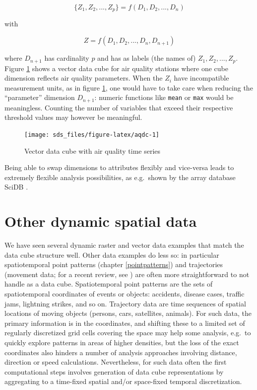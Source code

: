 \documentclass[]{book}
\begin{document}
\[\{Z_1,Z_2,...,Z_p\} = f(D_1,D_2,...,D_n)\]

with

\[Z = f(D_1,D_2,...,D_n, D_{n+1})\]

where \(D_{n+1}\) has cardinality \(p\) and has as labels (the names
of) \(Z_1,Z_2,...,Z_p\). Figure \ref{fig:aqdc} shows a vector data
cube for air quality stations where one cube dimension reflects
air quality parameters. When the \(Z_i\) have incompatible measurement
units, as in figure \ref{fig:aqdc}, one would have to take care
when reducing the ``parameter'' dimension \(D_{n+1}\): numeric functions
like \texttt{mean} or \texttt{max} would be meaningless. Counting the number of
variables that exceed their respective threshold values may however
be meaningful.

\begin{figure}

{\centering \texttt{[image: sds\_files/figure-latex/aqdc-1]} 

}

\caption{Vector data cube with air quality time series}\label{fig:aqdc}
\end{figure}

Being able to swap dimensions to attributes flexibly and vice-versa
leads to extremely flexible analysis possibilities, as e.g.~shown
by the array database SciDB \citep{brown2010overview}.

\hypertarget{otherdynamic}{%
\section{Other dynamic spatial data}\label{otherdynamic}}

We have seen several dynamic raster and vector data examples
that match the data cube structure well. Other data examples
do less so: in particular spatiotemporal point patterns (chapter
\ref{pointpatterns}) and trajectories (movement data; for a recent review, see \citet{https://doi.org/10.1111/1365-2656.13116}) are often more
straightforward to not handle as a data cube. Spatiotemporal point
patterns are the sets of spatiotemporal coordinates of events or
objects: accidents, disease cases, traffic jams, lightning strikes,
and so on. Trajectory data are time sequences of spatial locations of
moving objects (persons, cars, satellites, animals). For such data,
the primary information is in the coordinates, and shifting these
to a limited set of regularly discretized grid cells covering the
space may help some analysis, e.g.~to quickly explore patterns in
areas of higher densities, but the loss of the exact coordinates
also hinders a number of analysis approaches involving distance,
direction or speed calculations. Nevertheless, for such data often
the first computational steps involves generation of data cube
representations by aggregating to a time-fixed spatial and/or
space-fixed temporal discretization.
\end{document}

